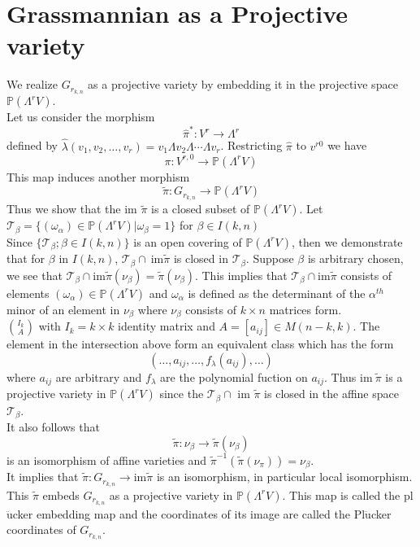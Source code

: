 \documentclass[12pt]{report}
\theoremstyle{theorem}
\begin{document}
\section*{Grassmannian as a Projective variety}
We realize $G_{r_{k,n}}$ as a projective variety by embedding it in the projective space $\mathbb{P}(\Lambda^rV).$\\
Let us consider the morphism
$$
\hat{\pi}^*:V^r \longrightarrow \Lambda^r
$$
defined by $\hat{\lambda}(v_1,v_2,\ldots,v_r) = v_1\Lambda v_2\Lambda \cdots\Lambda v_r$. Restricting $\hat{\pi}$ to $v^{r0}$ we have 
$$
\pi: V^{r,0}\longrightarrow \mathbb{P}(\Lambda^rV)
$$
This map induces another morphism
$$
\tilde{\pi}:  G_{r_{k,n}}\longrightarrow \mathbb{P}(\Lambda^rV)
$$
Thus we show that the im $\tilde{\pi}$ is a closed subset of $\mathbb{P}(\Lambda^rV)$. Let $\mathcal{T}_{\beta} = \{(\omega_\alpha)\in\mathbb{P}(\Lambda^rV)|\omega_\beta  = 1\}$ for $\beta\in I(k,n)$\\
Since $\{\mathcal{T}_\beta; \beta\in I(k,n)\}$ is an open covering of $\mathbb{P}(\Lambda^rV)$, then we demonstrate that for $\beta$ in $I(k,n)$, $\mathcal{T}_\beta\cap~\mbox{im}\tilde{\pi}$ is closed in $\mathcal{T}_\beta$. Suppose $\beta$ is arbitrary chosen, we see that $\mathcal{T}_\beta\cap \mbox{im}\tilde{\pi}(\nu_\beta) = \tilde{\pi}(\nu_\beta).$ This implies that $\mathcal{T}_\beta\cap\mbox{im}\tilde{\pi}$ consists of elements $(\omega_\alpha)\in\mathbb{P}(\Lambda^rV)$ and $\omega_\alpha$ is defined as the determinant of the $\alpha^{th}$ minor of an element in $\nu_\beta$ where $\nu_\beta$ consists of $k\times n$ matrices form.\\
$\binom{I_k}{A}$ with $I_k = k\times k$ identity matrix and $A = [a_{ij}]\in M(n-k,k)$. The element in the intersection above form an equivalent class which has the form 
$$
(\ldots,a_{ij},\ldots,f_\lambda(a_{ij}),\ldots)
$$
where $a_{ij}$ are arbitrary and $f_{\lambda}$ are the polynomial fuction on $a_{ij}$. Thus $\mbox{im}~\tilde{\pi}$ is a projective variety in $\mathbb{P}(\Lambda^rV)$ since the $\mathcal{T}_\beta\cap \mbox{ im }\tilde{\pi}$ is closed in the affine space $\mathcal{T}_\beta$.\\
It also follows that
$$
\tilde{\pi}: \nu_\beta\longrightarrow \tilde{\pi}(\nu_\beta)
$$
is an isomorphism of affine varieties and $\tilde{\pi}^{-1}(\tilde{\pi}(\nu_\pi)) = \nu_\beta$.\\
It implies that $\tilde{\pi}:G_{r_{k,n}} \longrightarrow \mbox{
im}\tilde{\pi}$ is an isomorphism, in particular local isomorphism. This $\tilde{\pi}$ embeds $G_{r_{k,n}}$ as a projective variety in $\mathbb{P}(\Lambda^rV)$. This map is called the pl$\ddot{\mbox{u}}$cker embedding map and the coordinates of its image are called the Pl$\ddot{\mbox{u}}$cker coordinates of $G_{r_{k,n}}$.
\end{document}
